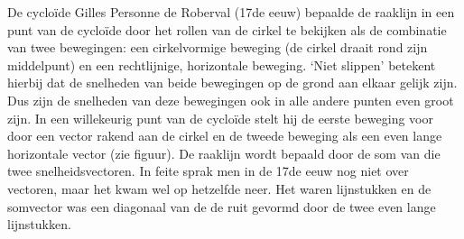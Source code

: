 \begin{lesactiviteit}{De cycloïde}
    Gilles Personne de Roberval (17de eeuw) bepaalde de raaklijn in een punt van de cycloïde door het rollen van de cirkel te bekijken als de combinatie van twee bewegingen: een cirkelvormige beweging (de cirkel draait rond zijn middelpunt) en een rechtlijnige, horizontale beweging. `Niet slippen' betekent hierbij dat de snelheden van beide bewegingen op de grond aan elkaar gelijk zijn. Dus zijn de snelheden van deze bewegingen ook in alle andere punten even groot zijn. In een willekeurig punt van de cycloïde stelt hij de eerste beweging voor door een vector rakend aan de cirkel en de tweede beweging als een even lange horizontale vector (zie figuur). De raaklijn wordt bepaald door de som van die twee snelheidsvectoren. In feite sprak men in de 17de eeuw nog niet over vectoren, maar het kwam wel op hetzelfde neer. Het waren lijnstukken en de somvector was een diagonaal van de de ruit gevormd door de twee even lange lijnstukken.
    
    
\begin{vraagenantwoord}[resume]



\end{vraagenantwoord}

\end{lesactiviteit}

